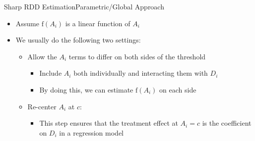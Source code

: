 \documentclass[hyperref={pdfpagelabels=false}]{beamer}
\begin{document}
\begin{frame}{Sharp RDD Estimation}{Parametric/Global Approach}
	\begin{itemize}
		
		\item Assume $\mathrm{f}(A_i)$ is a linear function of $A_{i}$
		\vspace{0.2cm}
		\item We usually do the following two settings:
		\vspace{0.2cm}
			\begin{itemize}
		\item[1] Allow the $A_i$ terms to differ on both sides of the threshold 
				\vspace{0.2cm}
			\begin{itemize}
			\item Include $A_{i}$ both individually and interacting them with $D_i$
			\vspace{0.2cm}
			\item By doing this, we can estimate $\mathrm{f}(A_i)$ on each side
						\vspace{0.2cm}
		\end{itemize}
			\item[2] Re-center $A_{i}$ at $c$: 
		\vspace{0.2cm}
		\begin{itemize}
			\item This step ensures that the treatment effect at $A_i=c$ is the coefficient on $D_i$ in a regression model 
		\end{itemize}
		
			\end{itemize}
	
	
		
		
		
		
		
		
	\end{itemize}
\end{frame}
\end{document}
